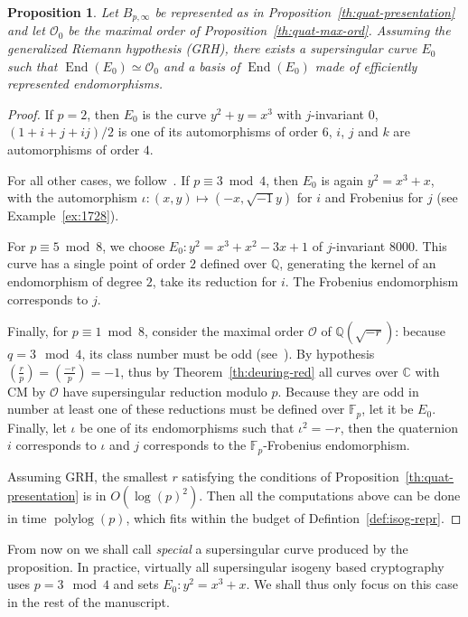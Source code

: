 \documentclass[10pt]{article}
\theoremstyle{plain}
\newtheorem{proposition}[theorem]{Proposition}
\theoremstyle{definition}
\DeclareMathOperator{\End}{End} %
\DeclareMathOperator{\polylog}{polylog}
\def\F{\ensuremath{\mathbb{F}}}
\def\O{\ensuremath{\mathcal{O}}}
\begin{document}
\begin{proposition}
  \label{th:E0}
  Let $B_{p,∞}$ be represented as in
  Proposition~\ref{th:quat-presentation} and let $\O_0$ be the maximal
  order of Proposition~\ref{th:quat-max-ord}. %
  Assuming the generalized Riemann hypothesis (GRH), there exists a
  supersingular curve $E_0$ such that $\End(E_0)≃\O_0$ and a basis of
  $\End(E_0)$ made of efficiently represented endomorphisms.
\end{proposition}
\begin{proof}
  If $p = 2$, then $E_0$ is the curve $y^2 + y = x^3$ with
  $j$-invariant 0, $(1 + i + j + ij)/2$ is one of its automorphisms of order
  $6$, $i$, $j$ and $k$ are automorphisms of order $4$.
  
  For all other cases, we follow~\cite[Proposition~3]{EC:EHLMP18}. %
  If $p ≡ 3 \bmod 4$, then $E_0$ is again $y^2 = x^3 + x$, with the
  automorphism $ι:(x,y)↦(-x,\sqrt{-1} y)$ for $i$ and Frobenius for
  $j$ (see Example~\ref{ex:1728}).

  For $p ≡ 5 \bmod 8$, we choose $E_0 : y^2 = x^3 + x^2 - 3x + 1$ of
  $j$-invariant $8000$. %
  This curve has a single point of order $2$ defined over $ℚ$,
  generating the kernel of an endomorphism of degree $2$, take its
  reduction for $i$. %
  The Frobenius endomorphism corresponds to $j$.
  
  Finally, for $p ≡ 1 \bmod 8$, consider the maximal order $\O$ of
  $ℚ(\sqrt{-r})$: because $q = 3 \mod 4$, its class number must be odd
  (see~\cite{mordell61}). %
  By hypothesis
  $\left(\frac{r}{p}\right) = \left(\frac{-r}{p}\right) = -1$, thus by
  Theorem~\ref{th:deuring-red} all curves over $ℂ$ with CM by $\O$
  have supersingular reduction modulo $p$. %
  Because they are odd in number at least one of these reductions must
  be defined over $\F_p$, let it be $E_0$. %
  Finally, let $ι$ be one of its endomorphisms such that $ι^2 = -r$,
  then the quaternion $i$ corresponds to $ι$ and $j$ corresponds to
  the $\F_p$-Frobenius endomorphism.

  Assuming GRH, the smallest $r$ satisfying the conditions of
  Proposition~\ref{th:quat-presentation} is in $O(\log(p)^2)$. %
  Then all the computations above can be done in time $\polylog(p)$,
  which fits within the budget of Defintion~\ref{def:isog-repr}.
\end{proof}

From now on we shall call \emph{special} a supersingular curve
produced by the proposition. %
In practice, virtually all supersingular isogeny based cryptography
uses $p = 3 \mod 4$ and sets $E_0:y^2 = x^3 + x$. %
We shall thus only focus on this case in the rest of the manuscript.
\end{document}
